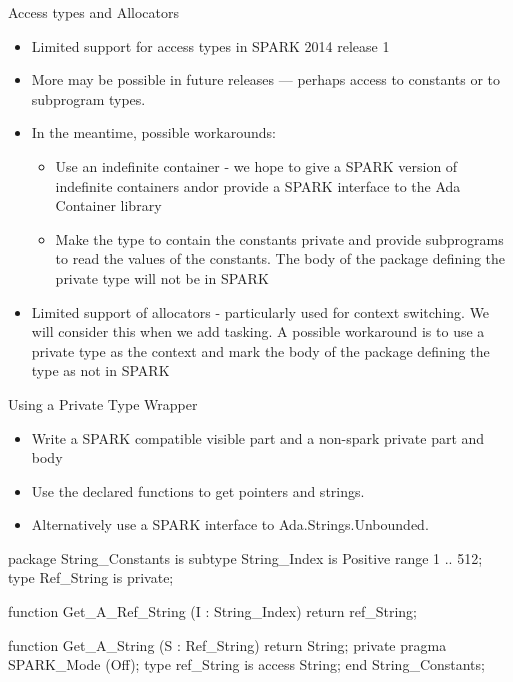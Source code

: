 \documentclass{beamer}
\begin{document}
\begin{frame}{Access types and Allocators}

  \begin{itemize}

  \item Limited support for access types in SPARK 2014 release 1
  \item More may be possible in future releases --- perhaps access to constants or to subprogram types. 
  \item In the meantime, possible workarounds:
   \begin{itemize}
    \item Use an indefinite container - we hope to give a SPARK
      version of indefinite containers and\/or provide a SPARK
      interface to the Ada Container library
   \item Make the type to contain the constants private and provide
     subprograms to read the values of the constants. The body of the
     package defining the private type will not be in SPARK
  \end{itemize}
  \item Limited support of allocators - particularly used for context
    switching.  We will consider this when we add tasking. A possible
    workaround is to use a private type as the context and mark the
    body of the package defining the type as not in SPARK
  \end{itemize}

\end{frame}

\begin{frame}[fragile]{Using a Private Type Wrapper}

  \begin{itemize}

    \item Write a SPARK compatible visible part and a non-spark private part and body
    \item Use the declared functions to get pointers and strings.
    \item Alternatively use a SPARK interface to Ada.Strings.Unbounded. 
  \end{itemize}

  \begin{pxcode}[language=SPARK,style=tinystyle,gobble=4]
    package String_Constants
    is
        subtype String_Index is Positive range 1 .. 512;
        type Ref_String is private;

        function Get_A_Ref_String (I : String_Index) return ref_String;

        function Get_A_String (S : Ref_String) return String;
    private
       pragma SPARK_Mode (Off);
       type ref_String is access String;
   end String_Constants; 
  \end{pxcode}

\end{frame}
\end{document}
